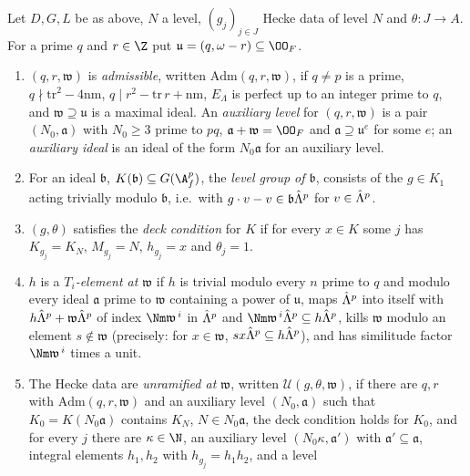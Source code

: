 \begin{definition}\label{pf:ks2:def:goodgrp}
Let $D,G,L$ be as above, $N$ a level, $(g_j)_{j\in J}$ Hecke data of level $N$ and
$\theta\colon J\to A$. For a prime $q$ and $r\in\Z$ put $\mathfrak u=(q,\omega-r)\subseteq\kstwoOF$.
\begin{enumerate}
\item $(q,r,\mathfrak w)$ is \emph{admissible}, written $\mathrm{Adm}(q,r,\mathfrak w)$, if $q\ne p$ is a
  prime, $q\nmid\mathrm{tr}^2-4\mathrm{nm}$, $q\mid r^2-\mathrm{tr}\,r+\mathrm{nm}$, $E_\Lambda$ is
  perfect up to an integer prime to $q$, and $\mathfrak w\supseteq\mathfrak u$ is a maximal ideal.
  An \emph{auxiliary level} for $(q,r,\mathfrak w)$ is a pair $(N_0,\mathfrak a)$ with $N_0\ge3$ prime
  to $pq$, $\mathfrak a+\mathfrak w=\kstwoOF$ and $\mathfrak a\supseteq\mathfrak u^e$ for some $e$; an
  \emph{auxiliary ideal} is an ideal of the form $N_0\mathfrak a$ for an auxiliary level.
\item For an ideal $\mathfrak b$, $K(\mathfrak b)\subseteq\kstwoG$, the \emph{level group of $\mathfrak b$},
  consists of the $g\in K_1$ acting trivially modulo $\mathfrak b$, i.e.\ with $g\cdot v-v\in\mathfrak
  b\hat\Lambda^{p}$ for $v\in\hat\Lambda^{p}$.
\item $(g,\theta)$ satisfies the \emph{deck condition} for $K$
  if for every $x\in K$ some $j$ has $K_{g_j}=K_N$, $M_{g_j}=N$, $h_{g_j}=x$ and $\theta_j=1$.
\item $h$ is a \emph{$T_i$-element at $\mathfrak w$} if
  $h$ is trivial modulo every $n$ prime to $q$ and modulo every ideal $\mathfrak a$ prime to
  $\mathfrak w$ containing a power of $\mathfrak u$, maps $\hat\Lambda^{p}$ into itself with
  $h\hat\Lambda^{p}+\mathfrak w\hat\Lambda^{p}$ of index $\Nm\mathfrak w^{\,i}$ in $\hat\Lambda^{p}$ and
  $\Nm\mathfrak w^{\,i}\kstwoLaHat\subseteq h\kstwoLaHat$, kills $\mathfrak w$ modulo an element
  $s\notin\mathfrak w$ (precisely: for $x\in\mathfrak w$, $sx\hat\Lambda^{p}\subseteq h\hat\Lambda^{p}$),
  and has similitude factor $\Nm\mathfrak w^{\,i}$ times a unit.
\item The Hecke data are \emph{unramified at $\mathfrak w$}, written $\mathcal{U}(g,\theta,\mathfrak w)$,
  if there are $q,r$ with $\mathrm{Adm}(q,r,\mathfrak w)$ and an auxiliary level $(N_0,\mathfrak a)$ such
  that $K_0=K(N_0\mathfrak a)$ contains $K_N$, $N\in N_0\mathfrak a$, the deck condition holds for $K_0$,
  and for every $j$ there are $\kappa\in\N$, an auxiliary level $(N_0\kappa,\mathfrak a')$ with
  $\mathfrak a'\subseteq\mathfrak a$, integral elements $h_1,h_2$ with $h_{g_j}=h_1h_2$, and a level

\end{enumerate}
\end{definition}
